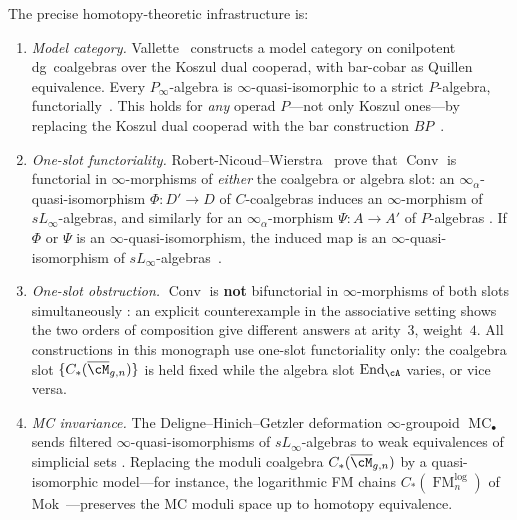 \begin{remark}
The precise homotopy-theoretic infrastructure is:
\begin{enumerate}[label=\textup{(\alph*)}]
\item \emph{Model category.}
  Vallette~\cite[Theorem~2.1]{Val16} constructs a model category on
  conilpotent dg~coalgebras over the Koszul dual cooperad,
  with bar-cobar as Quillen equivalence.  Every
  $P_\infty$-algebra is $\infty$-quasi-isomorphic to a strict
  $P$-algebra, functorially~\cite[Theorem~1.2]{Val16}.
  This holds for \emph{any} operad $P$---not only Koszul ones---by
  replacing the Koszul dual cooperad with the bar
  construction $BP$~\cite[\S1.6]{Val16}.
\item \emph{One-slot functoriality.}
  Robert-Nicoud--Wierstra~\cite[Theorem~5.1]{RNW19} prove that
  $\operatorname{Conv}$ is functorial in $\infty$-morphisms of
  \emph{either} the coalgebra or algebra slot:
  an $\infty_\alpha$-quasi-isomorphism $\Phi\colon D' \to D$
  of $C$-coalgebras induces an $\infty$-morphism of
  $sL_\infty$-algebras, and similarly for an
  $\infty_\alpha$-morphism $\Psi\colon A \to A'$ of $P$-algebras
  \cite[Corollary~5.4]{RNW19}.
  If $\Phi$ or $\Psi$ is an $\infty$-quasi-isomorphism, the
  induced map is an $\infty$-quasi-isomorphism of
  $sL_\infty$-algebras~\cite[Proposition~5.5]{RNW19}.
\item \emph{One-slot obstruction.}
  $\operatorname{Conv}$ is \textbf{not} bifunctorial in
  $\infty$-morphisms of both slots simultaneously
  \cite[Theorem~6.6]{RNW19}: an explicit counterexample
  in the associative setting shows the two orders of composition
  give different answers at arity~$3$, weight~$4$.
  All constructions in this monograph use one-slot functoriality
  only: the coalgebra slot $\{C_*(\overline{\cM}_{g,n})\}$ is held
  fixed while the algebra slot $\operatorname{End}_{\cA}$ varies,
  or vice versa.
\item \emph{MC invariance.}
  The Deligne--Hinich--Getzler deformation $\infty$-groupoid
  $\operatorname{MC}_\bullet$ sends filtered
  $\infty$-quasi-isomorphisms of $sL_\infty$-algebras
  to weak equivalences of simplicial sets
  \cite[Theorem~8.10]{RNW19}.  Replacing the moduli
  coalgebra $C_*(\overline{\cM}_{g,n})$ by a quasi-isomorphic
  model---for instance, the logarithmic FM chains
  $C_*(\operatorname{FM}^{\mathrm{log}}_n)$
  of Mok~\cite{Mok25}---preserves the MC moduli space up to
  homotopy equivalence.
\end{enumerate}
\end{remark}

